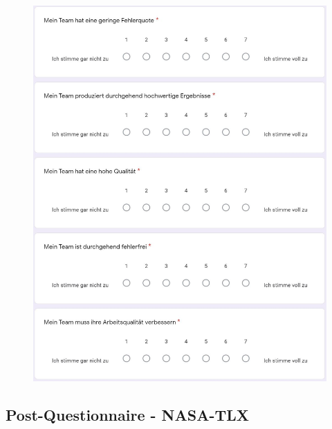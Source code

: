 \documentclass[a4paper,11pt]{article}%
\renewcommand{\\}{\vspace*{0.5\baselineskip} \newline}
\begin{document}
	\begin{figure}[H]
	\centering
		\begin{footnotesize}
			\includegraphics[scale=0.6]{Abbildungen/Fragebogen/Post-Questionnaire/PQTE1}
		\end{footnotesize}
	\end{figure}	

\newpage
\subsection{Post-Questionnaire - NASA-TLX}
\label{Post-Questionnaire - NASA-TLX}
\end{document}
